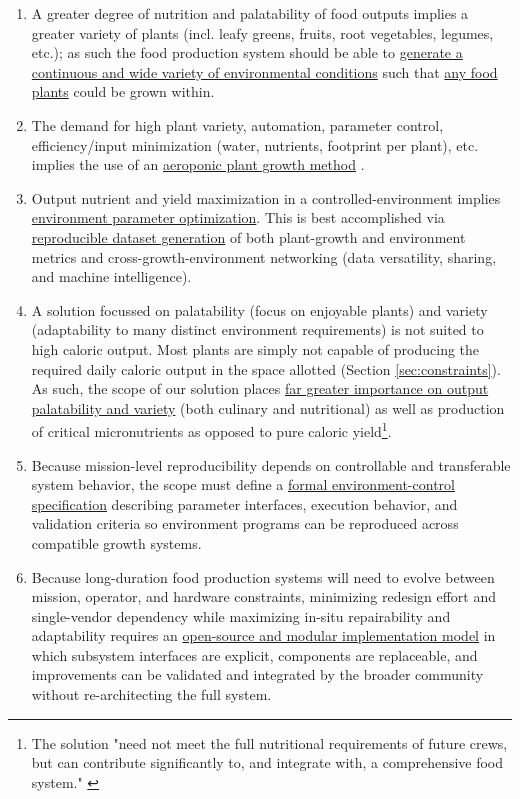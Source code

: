 \documentclass{../tex/report}
\begin{document}
\begin{enumerate}[label=SC\arabic*., ref=SC\arabic*]
\newpage
    \item \label{sc:5} A greater degree of nutrition and palatability of food outputs implies a greater variety of plants (incl. leafy greens, fruits, root vegetables, legumes, etc.); as such the food production system should be able to \uline{generate a continuous and wide variety of environmental conditions} such that \uline{any food plants} could be grown within.
    \item \label{sc:6} The demand for high plant variety, automation, parameter control, efficiency/input minimization (water, nutrients, footprint per plant), etc. implies the use of an \uline{aeroponic plant growth method} \cite{spinoff}.
    \item \label{sc:7} Output nutrient and yield maximization in a controlled-environment implies \uline{environment parameter optimization}. This is best accomplished via \uline{reproducible dataset generation} of both plant-growth and environment metrics and cross-growth-environment networking (data versatility, sharing, and machine intelligence).
    \item \label{sc:8} A solution focussed on palatability (focus on enjoyable plants) and variety (adaptability to many distinct environment requirements) is not suited to high caloric output. Most plants are simply not capable of producing the required daily caloric output in the space allotted (Section \ref{sec:constraints}). As such, the scope of our solution places \uline{far greater importance on output palatability and variety} (both culinary and nutritional) as well as production of critical micronutrients as opposed to pure caloric yield\footnote{The solution "need not meet the full nutritional requirements of future crews, but can contribute significantly to, and integrate with, a comprehensive food system." \cite{applicantguide}}.
    \item \label{sc:9} Because mission-level reproducibility depends on controllable and transferable system behavior, the scope must define a \uline{formal environment-control specification} describing parameter interfaces, execution behavior, and validation criteria so environment programs can be reproduced across compatible growth systems.
    \item \label{sc:10} Because long-duration food production systems will need to evolve between mission, operator, and hardware constraints, minimizing redesign effort and single-vendor dependency while maximizing in-situ repairability and adaptability requires an \uline{open-source and modular implementation model} in which subsystem interfaces are explicit, components are replaceable, and improvements can be validated and integrated by the broader community without re-architecting the full system.
\end{enumerate}
\end{document}
